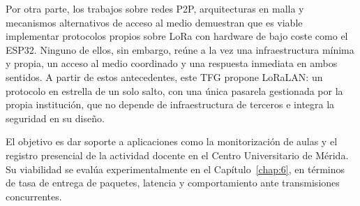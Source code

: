 Por otra parte, los trabajos sobre redes P2P, arquitecturas en malla y mecanismos
alternativos de acceso al medio demuestran que es viable implementar protocolos
propios sobre LoRa con hardware de bajo coste como el ESP32. Ninguno de ellos,
sin embargo, reúne a la vez una infraestructura mínima y propia, un acceso al
medio coordinado y una respuesta inmediata en ambos sentidos. A partir de estos
antecedentes, este TFG propone LoRaLAN: un protocolo en estrella de un solo salto,
con una única pasarela gestionada por la propia institución, que no depende de
infraestructura de terceros e integra la seguridad en su diseño.

El objetivo es dar soporte a aplicaciones como la monitorización de aulas y el
registro presencial de la actividad docente en el Centro Universitario de Mérida.
Su viabilidad se evalúa experimentalmente en el Capítulo~\ref{chap:6},
en términos de tasa de entrega de paquetes, latencia y comportamiento ante
transmisiones concurrentes.
